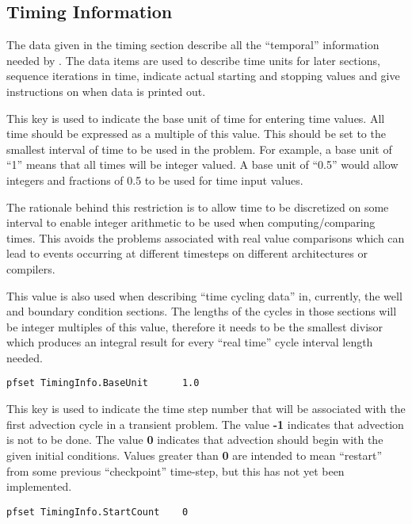 
\subsection{Timing Information}
\label{Timing Information}

The data given in the timing section describe all the ``temporal''
information needed by \parflow{}.  The data items are used to
describe time units for later sections, sequence iterations in time,
indicate actual starting and stopping values and give instructions
on when data is printed out.

 { This key is used to
  indicate the base unit of time for entering time values.  All time
  should be expressed as a multiple of this value.  This should be set
  to the smallest interval of time to be used in the problem.  For
  example, a base unit of ``1'' means that all times will be integer
  valued.  A base unit of ``0.5'' would allow integers and fractions
  of 0.5 to be used for time input values.

  The rationale behind this restriction is to allow time to be
  discretized on some interval to enable integer arithmetic to be used
  when computing/comparing times.  This avoids the problems associated
  with real value comparisons which can lead to events occurring at
  different timesteps on different architectures or compilers.

  This value is also used when describing ``time cycling data'' in,
  currently, the well and boundary condition sections.  The lengths of
  the cycles in those sections will be integer multiples of this
  value, therefore it needs to be the smallest divisor which produces
  an integral result for every ``real time'' cycle interval length
  needed.
}
\begin{display}\begin{verbatim}
pfset TimingInfo.BaseUnit      1.0
\end{verbatim}\end{display}

{
This key is used to indicate the time step number that will be associated
with the first advection cycle in a transient problem.  The value
{\bf -1} indicates that advection is not to be done.  The value {\bf 0}
indicates that advection should begin with the given initial conditions.
Values greater than {\bf 0} are intended to mean ``restart'' from some
previous ``checkpoint'' time-step, but this has not yet been implemented.
}
\begin{display}\begin{verbatim}
pfset TimingInfo.StartCount    0
\end{verbatim}\end{display}

